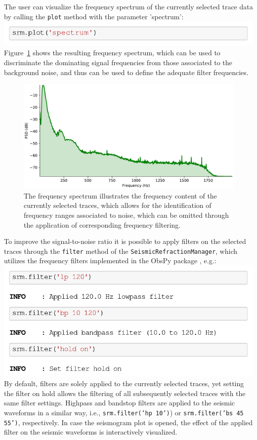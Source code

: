 \documentclass[a4paper,fleqn]{cas-sc}
\begin{document}
The user can visualize the frequency spectrum of the currently selected trace data by calling the \texttt{plot} method with the parameter 'spectrum':
\newline
\includegraphics[width=.5\textwidth]{./figures/plot_spectrum.pdf}
\newline
Figure~\ref{fig:spectrum} shows the resulting frequency spectrum, which can be used to discriminate the dominating signal frequencies from those associated to the background noise, and thus can be used to define the adequate filter frequencies.
\begin{figure}
	\centering
	\includegraphics[width=.75\textwidth]{figures/spectrum.pdf}
	\caption{The frequency spectrum illustrates the frequency content of the currently selected traces, which allows for the identification of frequency ranges associated to noise, which can be omitted through the application of corresponding frequency filtering.}
	\label{fig:spectrum}
\end{figure}
To improve the signal-to-noise ratio it is possible to apply filters on the selected traces through the \texttt{filter} method of the \texttt{SeismicRefractionManager}, which utilizes the frequency filters implemented in the ObsPy package \citep[lowpass, highpass, bandpass and bandstop;][]{beyreuther2010}, e.g.:
\newline
\includegraphics[width=.5\textwidth]{./figures/filter.pdf}
\newline
By default, filters are solely applied to the currently selected traces, yet setting the filter on hold allows the filtering of all subsequently selected traces with the same filter settings.
Highpass and bandstop filters are applied to the seismic waveforms in a similar way, i.e., \texttt{srm.filter('hp 10')}) or \texttt{srm.filter('bs 45 55')}, respectively. In case the seismogram plot is opened, the effect of the applied filter on the seismic waveforms is interactively visualized.
\end{document}
